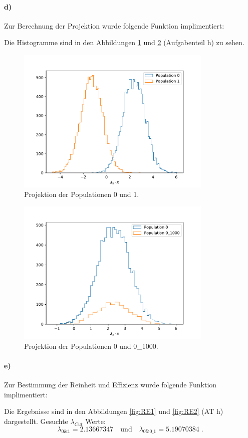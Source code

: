 \paragraph{d)}
Zur Berechnung der Projektion wurde folgende Funktion implimentiert:

Die Histogramme sind in den Abbildungen \ref{fig:hist01} und \ref{fig:hist001} (Aufgabenteil h) zu sehen.
\begin{figure}
  \centering
  \includegraphics[height = 7cm]{plots/Projektion1dimhist.pdf}
  \caption{Projektion der Populationen 0 und 1.}
  \label{fig:hist01}
\end{figure}
\begin{figure}
  \centering
  \includegraphics[height = 7cm]{plots/2Projektion1dimhist.pdf}
  \caption{Projektion der Populationen 0 und 0\_1000.}
  \label{fig:hist001}
\end{figure}
\FloatBarrier
\paragraph{e)}
Zur Bestimmung der Reinheit und Effizienz wurde folgende Funktion implimentiert:

Die Ergebnisse sind in den Abbildungen \ref{fig:RE1} und \ref{fig:RE2} (AT h) dargestellt.
Gesuchte $\lambda_{Cut}$ Werte:
\begin{equation}
\lambda_{0\&1} = 2.13667347 \quad \text{und} \quad \lambda_{0\&0\_1} = 5.19070384	\; .
\end{equation}

